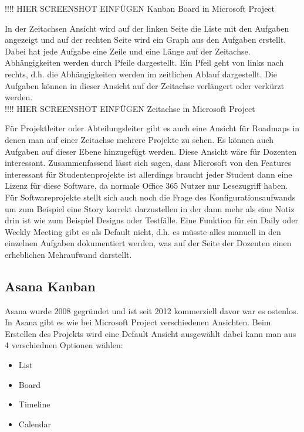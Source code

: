 !!!! HIER SCREENSHOT EINFÜGEN
Kanban Board in Microsoft Project 

In der Zeitachsen Ansicht wird auf der linken Seite die Liste mit den Aufgaben angezeigt und auf der rechten Seite wird ein Graph aus den Aufgaben erstellt. Dabei hat jede Aufgabe eine Zeile und eine Länge auf der Zeitachse.\\
Abhängigkeiten werden durch Pfeile dargestellt. Ein Pfeil geht von links nach rechts, d.h. die Abhängigkeiten werden im zeitlichen Ablauf dargestellt. Die Aufgaben können in dieser Ansicht auf der Zeitachse verlängert oder verkürzt werden.\\

!!!! HIER SCREENSHOT EINFÜGEN
Zeitachse in Microsoft Project 

Für Projektleiter oder Abteilungsleiter gibt es auch eine Ansicht für Roadmaps in denen man auf einer Zeitachse mehrere Projekte zu sehen. Es können auch Aufgaben auf dieser Ebene hinzugefügt werden. Diese Ansicht wäre für Dozenten interessant. Zusammenfassend lässt sich sagen, dass Microsoft von den Features interessant für Studentenprojekte ist allerdings braucht jeder Student dann eine Lizenz für diese Software, da normale Office 365 Nutzer nur Lesezugriff haben. Für Softwareprojekte stellt sich auch noch die Frage des Konfigurationsaufwands um zum Beispiel eine Story korrekt darzustellen in der dann mehr als eine Notiz drin ist wie zum Beispiel Designs oder Testfälle.  Eine Funktion für ein Daily oder Weekly Meeting gibt es als Default nicht, d.h. es müsste alles manuell in den einzelnen Aufgaben dokumentiert werden, was auf der Seite der Dozenten einen erheblichen Mehraufwand darstellt.  

\subsection{Asana Kanban}

Asana wurde 2008 gegründet und ist seit 2012 kommerziell davor war es ostenlos. In Asana gibt es wie bei Microsoft Project verschiedenen Ansichten. Beim Erstellen des Projekts wird eine Default Ansicht ausgewählt dabei kann man aus 4 verschiednen Optionen wählen:
\begin{itemize}
    \item List 
    \item Board 
    \item Timeline  
    \item Calendar 
\end{itemize}

